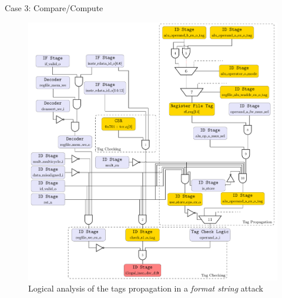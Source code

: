\begin{frame}[noframenumbering]{Case 3: Compare/Compute}
    \begin{figure}
        \centering
        \includegraphics[height=.85\textheight]{src/2_vuln_assessment/img/comp_compu/arborescence_propagation.pdf}
        \caption{Logical analysis of the tags propagation in a \textit{format string} attack}
        \label{fig:analyseLogiqueCompCompute}
    \end{figure}
\end{frame}

